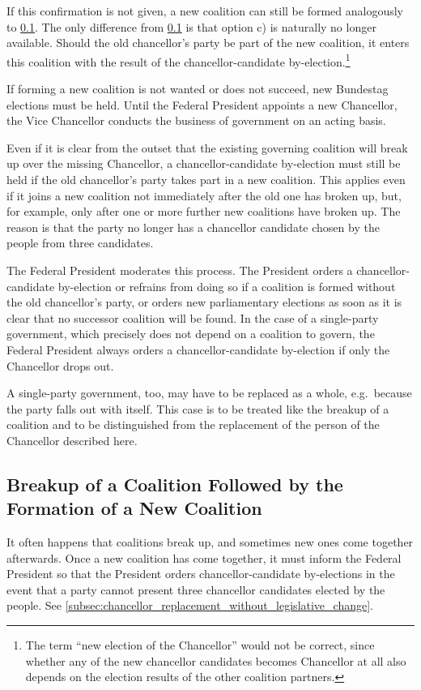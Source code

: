 If this confirmation is not given, a new coalition can still be formed analogously to \cref{subsec:coalition_breakup_with_new_coalition}.
The only difference from \cref{subsec:coalition_breakup_with_new_coalition} is that option c) is naturally no longer
available.
Should the old chancellor's party be part of the new coalition, it enters this coalition with the result of the chancellor-candidate by-election.\footnote{The term \enquote{new election of the Chancellor} would not be correct, since whether any of the new chancellor candidates becomes Chancellor at all also depends on the election results of the other coalition partners.}

If forming a new coalition is not wanted or does not succeed, new Bundestag elections must be held.
Until the Federal President appoints a new Chancellor, the Vice Chancellor conducts the business of government on an acting basis.

Even if it is clear from the outset that the existing governing coalition will break up over the missing Chancellor,
a chancellor-candidate by-election must still be held if the old chancellor's party takes part in a new coalition.
This applies even if it joins a new coalition not immediately after the old one has broken up,
but, for example, only after one or more further new coalitions have broken up.
The reason is that the party no longer has a chancellor candidate chosen by the people from three candidates.

The Federal President moderates this process.
The President orders a chancellor-candidate by-election or refrains from doing so if a coalition is formed without the old chancellor's party,
or orders new parliamentary elections as soon as it is clear that no successor coalition will be found.
In the case of a single-party government, which precisely does not depend on a coalition to govern, the Federal President
always orders a chancellor-candidate by-election if only the Chancellor drops out.

A single-party government, too, may have to be replaced as a whole, e.g.\ because the party falls out with itself.
This case is to be treated like the breakup of a coalition and to be distinguished from the replacement of the person of the Chancellor described here.

\subsection{Breakup of a Coalition Followed by the Formation of a New Coalition} \label{subsec:coalition_breakup_with_new_coalition}
It often happens that coalitions break up, and sometimes new ones come together afterwards.
Once a new coalition has come together, it must inform the Federal President so that the President orders chancellor-candidate by-elections
in the event that a party cannot present three chancellor candidates elected by the people.
See \cref{subsec:chancellor_replacement_without_legislative_change}.

